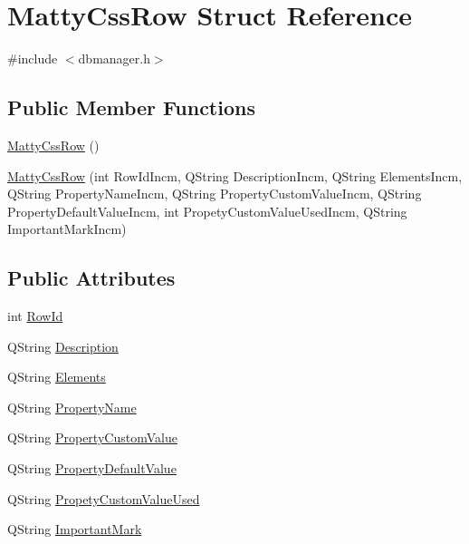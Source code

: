 \hypertarget{struct_matty_css_row}{}\section{Matty\+Css\+Row Struct Reference}
\label{struct_matty_css_row}


{\ttfamily \#include $<$dbmanager.\+h$>$}

\subsection*{Public Member Functions}
\begin{DoxyCompactItemize}
\item 
\hyperlink{struct_matty_css_row_ab6fe31f47305e7b236aa0d9bef503bd0}{Matty\+Css\+Row} ()
\item 
\hyperlink{struct_matty_css_row_a378ad84c0f27c827ee11b12209a2a22a}{Matty\+Css\+Row} (int Row\+Id\+Incm, Q\+String Description\+Incm, Q\+String Elements\+Incm, Q\+String Property\+Name\+Incm, Q\+String Property\+Custom\+Value\+Incm, Q\+String Property\+Default\+Value\+Incm, int Propety\+Custom\+Value\+Used\+Incm, Q\+String Important\+Mark\+Incm)
\end{DoxyCompactItemize}
\subsection*{Public Attributes}
\begin{DoxyCompactItemize}
\item 
int \hyperlink{struct_matty_css_row_a6e993981771efed8d27259785ddd430e}{Row\+Id}
\item 
Q\+String \hyperlink{struct_matty_css_row_a9da70580ad11e461e1bddd758c266ea2}{Description}
\item 
Q\+String \hyperlink{struct_matty_css_row_a22f071da15e975f48b6cb084beb62368}{Elements}
\item 
Q\+String \hyperlink{struct_matty_css_row_ad2039ab001752cafade09b6039df2b0a}{Property\+Name}
\item 
Q\+String \hyperlink{struct_matty_css_row_a3d902749e1621ccbbc7fd1857ec08d88}{Property\+Custom\+Value}
\item 
Q\+String \hyperlink{struct_matty_css_row_ab411d09040e1174d9c52548e70b477fc}{Property\+Default\+Value}
\item 
Q\+String \hyperlink{struct_matty_css_row_a72f2d0b934455456cc3dc37ac908e19a}{Propety\+Custom\+Value\+Used}
\item 
Q\+String \hyperlink{struct_matty_css_row_ab075befd4b57e7ad00e6465aa4096587}{Important\+Mark}
\end{DoxyCompactItemize}


